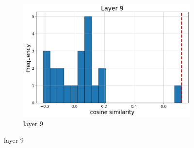 \documentclass[11pt]{article}
\begin{document}
\begin{figure}[t]
\begin{subfigure}[t]{0.24\textwidth}
    \includegraphics[width=1.4\columnwidth]{figures/obs2_appendix/obs2_layer9.png}
    \caption{layer 9}
  \end{subfigure}\hfill
    \vspace{2mm}
    

\end{figure}
\end{document}
